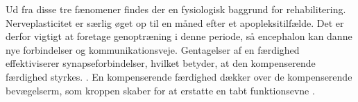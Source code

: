 Ud fra disse tre fænomener findes der en fysiologisk baggrund for rehabilitering. Nerveplasticitet er særlig øget op til en måned efter et apopleksitilfælde. Det er derfor vigtigt at foretage genoptræning i denne periode, så encephalon kan danne nye forbindelser og kommunikationsveje. \cite{Rugnett2015} Gentagelser af en færdighed effektiviserer synapseforbindelser, hvilket betyder, at den kompenserende færdighed styrkes. \cite{Stanfield2014}. En kompenserende færdighed dækker over de kompenserende bevægelserm, som kroppen skaber for at erstatte en tabt funktionsevne \cite{Takeuchi2012,Leea2009}. %



